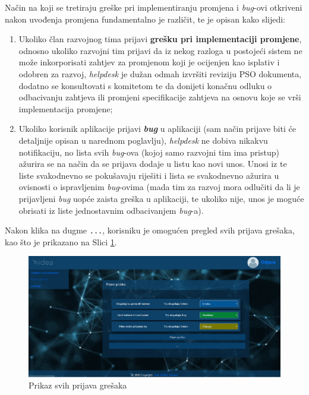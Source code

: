 \documentclass[12pt,a4paper]{article}
\begin{document}
Način na koji se tretiraju greške pri implementiranju promjena i \textit{bug}-ovi otkriveni nakon uvođenja promjena fundamentalno je različit, te je opisan kako slijedi:
\begin{enumerate}
\item Ukoliko član razvojnog tima prijavi \textbf{grešku pri implementaciji promjene}, odnosno ukoliko razvojni tim prijavi da iz nekog razloga u postojeći sistem ne može inkorporisati zahtjev za promjenom koji je ocijenjen kao isplativ i odobren za razvoj, \textit{helpdesk} je dužan odmah izvršiti reviziju PSO dokumenta, dodatno se konsultovati s komitetom te da donijeti konačnu odluku o odbacivanju zahtjeva ili promjeni specifikacije zahtjeva na osnovu koje se vrši implementacija promjene;
\item Ukoliko korisnik aplikacije prijavi \textbf{\textit{bug}} u aplikaciji (sam način prijave biti će detaljnije opisan u narednom poglavlju), \textit{helpdesk} ne dobiva nikakvu notifikaciju, no lista svih \textit{bug}-ova (kojoj samo razvojni tim ima pristup) ažurira se na način da se prijava dodaje u listu kao novi unos. Unosi iz te liste svakodnevno se pokušavaju riješiti i lista se svakodnevno ažurira u ovisnosti o ispravljenim \textit{bug}-ovima (mada tim za razvoj mora odlučiti da li je prijavljeni \textit{bug} uopće zaista greška u aplikaciji, te ukoliko nije, unos je moguće obrisati iz liste jednostavnim odbacivanjem \textit{bug}-a).
\end{enumerate}

Nakon klika na dugme \texttt{...}, korisniku je omogućen pregled svih prijava grešaka, kao što je prikazano na Slici \ref{s12}.

\begin{figure}[H]
\center
\includegraphics[scale=0.35]{../res/UI/errorAll.PNG}
\caption{Prikaz svih prijava grešaka}
\label{s12}
\end{figure}
\end{document}
